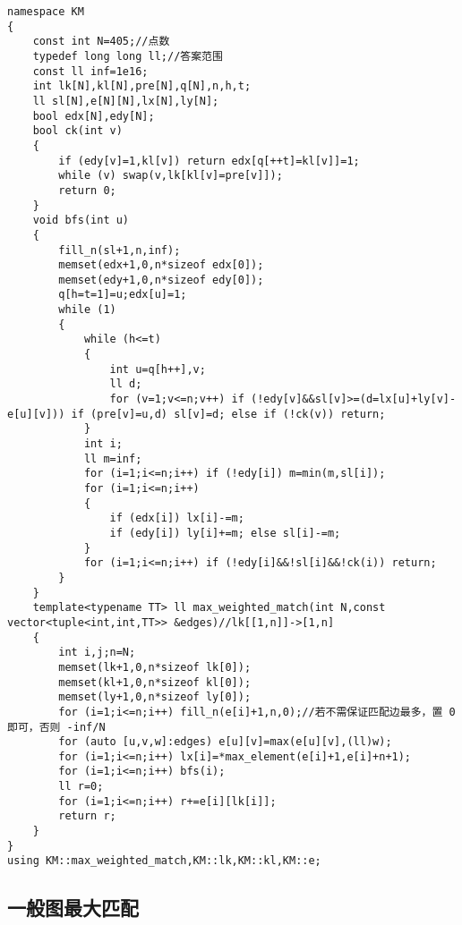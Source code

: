 \documentclass{ctexart}
\begin{document}
\begin{lstlisting}
namespace KM
{
	const int N=405;//点数
	typedef long long ll;//答案范围
	const ll inf=1e16;
	int lk[N],kl[N],pre[N],q[N],n,h,t;
	ll sl[N],e[N][N],lx[N],ly[N];
	bool edx[N],edy[N];
	bool ck(int v)
	{
		if (edy[v]=1,kl[v]) return edx[q[++t]=kl[v]]=1;
		while (v) swap(v,lk[kl[v]=pre[v]]);
		return 0;
	}
	void bfs(int u)
	{
		fill_n(sl+1,n,inf);
		memset(edx+1,0,n*sizeof edx[0]);
		memset(edy+1,0,n*sizeof edy[0]);
		q[h=t=1]=u;edx[u]=1;
		while (1)
		{
			while (h<=t)
			{
				int u=q[h++],v;
				ll d;
				for (v=1;v<=n;v++) if (!edy[v]&&sl[v]>=(d=lx[u]+ly[v]-e[u][v])) if (pre[v]=u,d) sl[v]=d; else if (!ck(v)) return;
			}
			int i;
			ll m=inf;
			for (i=1;i<=n;i++) if (!edy[i]) m=min(m,sl[i]);
			for (i=1;i<=n;i++)
			{
				if (edx[i]) lx[i]-=m;
				if (edy[i]) ly[i]+=m; else sl[i]-=m;
			}
			for (i=1;i<=n;i++) if (!edy[i]&&!sl[i]&&!ck(i)) return;
		}
	}
	template<typename TT> ll max_weighted_match(int N,const vector<tuple<int,int,TT>> &edges)//lk[[1,n]]->[1,n]
	{
		int i,j;n=N;
		memset(lk+1,0,n*sizeof lk[0]);
		memset(kl+1,0,n*sizeof kl[0]);
		memset(ly+1,0,n*sizeof ly[0]);
		for (i=1;i<=n;i++) fill_n(e[i]+1,n,0);//若不需保证匹配边最多，置 0 即可，否则 -inf/N
		for (auto [u,v,w]:edges) e[u][v]=max(e[u][v],(ll)w);
		for (i=1;i<=n;i++) lx[i]=*max_element(e[i]+1,e[i]+n+1);
		for (i=1;i<=n;i++) bfs(i);
		ll r=0;
		for (i=1;i<=n;i++) r+=e[i][lk[i]];
		return r;
	}
}
using KM::max_weighted_match,KM::lk,KM::kl,KM::e;
\end{lstlisting}

\subsection{一般图最大匹配}
\end{document}
